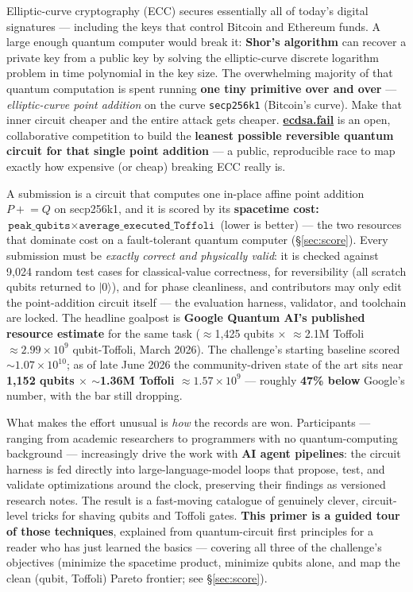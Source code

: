 \documentclass[11pt,a4paper]{article}
\begin{document}
Elliptic-curve cryptography (ECC) secures essentially all of today's digital signatures --- including
the keys that control Bitcoin and Ethereum funds. A large enough quantum computer would break it:
\textbf{Shor's algorithm} can recover a private key from a public key by solving the elliptic-curve
discrete logarithm problem in time polynomial in the key size. The overwhelming majority of that
quantum computation is spent running \textbf{one tiny primitive over and over} --- \emph{elliptic-curve
point addition} on the curve \texttt{secp256k1} (Bitcoin's curve). Make that inner circuit cheaper
and the entire attack gets cheaper.
\href{https://github.com/ecdsafail/ecdsafail-challenge}{\textbf{ecdsa.fail}} is an open, collaborative
competition to build the \textbf{leanest possible reversible quantum circuit for that single point
addition} --- a public, reproducible race to map exactly how expensive (or cheap) breaking ECC really
is.

A submission is a circuit that computes one in-place affine point addition $P \mathrel{+}= Q$ on
secp256k1, and it is scored by its \textbf{spacetime cost: $\texttt{peak\_qubits} \times
\texttt{average\_executed\_Toffoli}$} (lower is better) --- the two resources that dominate cost on a
fault-tolerant quantum computer (\S\ref{sec:score}). Every submission must be \emph{exactly correct
and physically valid}: it is checked against 9{,}024 random test cases for classical-value
correctness, for reversibility (all scratch qubits returned to $|0\rangle$), and for phase
cleanliness, and contributors may only edit the point-addition circuit itself --- the evaluation
harness, validator, and toolchain are locked. The headline goalpost is \textbf{Google Quantum AI's
published resource estimate} for the same task ($\approx$1{,}425 qubits $\times$ $\approx$2.1M Toffoli
$\approx 2.99 \times 10^{9}$ qubit-Toffoli, March 2026). The challenge's starting baseline scored
$\sim$$1.07 \times 10^{10}$; as of late June 2026 the community-driven state of the art sits near
\textbf{1{,}152 qubits $\times$ $\sim$1.36M Toffoli $\approx 1.57 \times 10^{9}$} --- roughly
\textbf{47\% below} Google's number, with the bar still dropping.

What makes the effort unusual is \emph{how} the records are won. Participants --- ranging from
academic researchers to programmers with no quantum-computing background --- increasingly drive the
work with \textbf{AI agent pipelines}: the circuit harness is fed directly into large-language-model
loops that propose, test, and validate optimizations around the clock, preserving their findings as
versioned research notes. The result is a fast-moving catalogue of genuinely clever, circuit-level
tricks for shaving qubits and Toffoli gates. \textbf{This primer is a guided tour of those
techniques}, explained from quantum-circuit first principles for a reader who has just learned the
basics --- covering all three of the challenge's objectives (minimize the spacetime product, minimize
qubits alone, and map the clean (qubit, Toffoli) Pareto frontier; see \S\ref{sec:score}).
\end{document}
